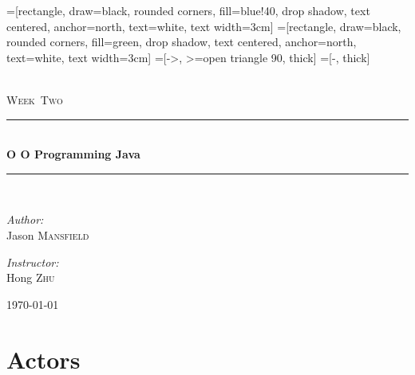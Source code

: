 \documentclass[11pt,a4paper]{article}
\newcommand{\HRule}{\rule{\linewidth}{0.5mm}}
\begin{document}
=[rectangle, draw=black, rounded corners, fill=blue!40, drop shadow,
        text centered, anchor=north, text=white, text width=3cm]
=[rectangle, draw=black, rounded corners, fill=green, drop shadow,
        text centered, anchor=north, text=white, text width=3cm]
=[->, >=open triangle 90, thick]
=[-, thick]
%
\begin{titlepage}
\begin{center}


\textsc{\color{Sepia}{\LARGE CS~434}}\\[1.5cm]
\textsc{\Large Week~Two}\\[0.5cm]
\HRule \\[0.4cm]
{ \huge \bfseries O O Programming Java}\\[0.4cm]
\HRule \\[1.5cm]


\begin{minipage}{0.4\textwidth}
\begin{flushleft} \large
\emph{Author:}\\
Jason \textsc{Mansfield}
\end{flushleft}
\end{minipage}
\begin{minipage}{0.4\textwidth}
\begin{flushright} \large
\emph{Instructor:} \\
Hong \textsc{Zhu}
\end{flushright}
\end{minipage}
\vfill
{\large \today}
\end{center}
\end{titlepage}
\tableofcontents
\section{Actors}
\end{document}
